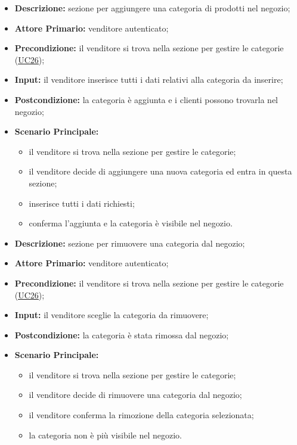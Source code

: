\label{sec:UC26.1}
\begin{itemize}
    \item \textbf{Descrizione:} sezione per aggiungere una categoria di prodotti nel negozio;
    \item \textbf{Attore Primario:} venditore autenticato;
    \item \textbf{Precondizione:} il venditore si trova nella sezione per gestire le categorie (\hyperref[sec:UC26]{\underline{UC26}});
    \item \textbf{Input:} il venditore inserisce tutti i dati relativi alla categoria da inserire;
    \item \textbf{Postcondizione:} la categoria è aggiunta e i clienti possono trovarla nel negozio;
    \item \textbf{Scenario Principale:}
          \begin{itemize}
              \item il venditore si trova nella sezione per gestire le categorie;
              \item il venditore decide di aggiungere una nuova categoria ed entra in questa sezione;
              \item inserisce tutti i dati richiesti;
              \item conferma l'aggiunta e la categoria è visibile nel negozio.
          \end{itemize}
\end{itemize}
\label{sec:UC26.2}
\begin{itemize}
    \item \textbf{Descrizione:} sezione per rimuovere una categoria dal negozio;
    \item \textbf{Attore Primario:} venditore autenticato;
    \item \textbf{Precondizione:} il venditore si trova nella sezione per gestire le categorie (\hyperref[sec:UC26]{\underline{UC26}});
    \item \textbf{Input:} il venditore sceglie la categoria da rimuovere;
    \item \textbf{Postcondizione:} la categoria è stata rimossa dal negozio;
    \item \textbf{Scenario Principale:}
          \begin{itemize}
              \item il venditore si trova nella sezione per gestire le categorie;
              \item il venditore decide di rimuovere una categoria dal negozio;
              \item il venditore conferma la rimozione della categoria selezionata;
              \item la categoria non è più visibile nel negozio.
          \end{itemize}
\end{itemize}

